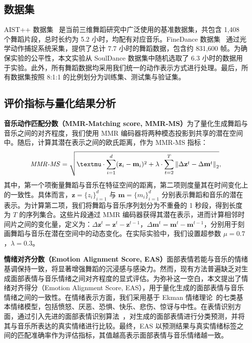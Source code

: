 \subsection{数据集}
AIST++ 数据集~\cite{li2021ai} 是当前三维舞蹈研究中广泛使用的基准数据集，共包含 1,408 个舞蹈片段，总时长约为 5.2 小时，均配有对应音乐。FineDance 数据集~\cite{li2023finedance} 通过光学动作捕捉系统采集，提供了总计 7.7 小时的舞蹈数据，包含约 831,600 帧。为确保实验的公平性，本文实验从 SoulDance 数据集中随机选取了 6.3 小时的数据用于实验。此外，所有舞蹈数据均采用我们统一的动作表示方式进行处理。最后，所有数据集按照 8:1:1 的比例划分为训练集、测试集与验证集。

\subsection{评价指标与量化结果分析}
\noindent\textbf{音乐动作匹配分数（MMR-Matching score, MMR-MS）}\quad  为了量化生成舞蹈与音乐之间的对齐程度，我们使用 MMR 编码器将两种模态投影到共享的潜在空间中。随后，计算其潜在表示之间的欧氏距离，作为 MMR-MS 指标：
\begin{equation}
\begin{aligned}
    \text{\textit{MMR-MS}} = \sqrt{\mu \cdot\sum_{i=1}^{d} (\mathbf{z}_i - \mathbf{m}_i)^2+\lambda \cdot \sum_{t=2}^T \left\Vert \Delta\mathbf{z}^t - \Delta\mathbf{m}^t \right\Vert_2},
\end{aligned}
\label{eq:mmr_ms}
\end{equation}
其中，第一个项衡量舞蹈与音乐在特征空间的距离，第二项则度量其在时间变化上的一致性。具体而言，$\mathbf{z} = \{z_i\}_{i=1}^d$ 与 $\mathbf{m} = \{m_i\}_{i=1}^d$ 分别表示舞蹈和音乐的潜在表示。为计算第二项，我们将舞蹈与音乐序列划分为不重叠的 1 秒段，得到长度为 $T$ 的序列集合。这些片段通过 MMR 编码器获得其潜在表示，进而计算相邻时间片之间的变化量，定义为：$\Delta\mathbf{z}^t = \mathbf{z}^t - \mathbf{z}^{t-1}$，$\Delta\mathbf{m}^t = \mathbf{m}^t - \mathbf{m}^{t-1}$，分别用于刻画舞蹈与音乐在潜在空间中的动态变化。在实际实验中，我们设置超参数 $\mu = 0.7$，$\lambda = 0.3$。



\noindent\textbf{情绪对齐分数（Emotion Alignment Score, EAS）}\quad  面部表情若能与音乐的情绪基调保持一致，将显著增强舞蹈的沉浸感与感染力。然而，现有方法普遍缺乏对生成面部表情与音乐情绪之间对齐程度的显式评估。为弥补这一空白，本文提出了情绪对齐得分（Emotion Alignment Score, EAS），用于量化生成的面部表情与音乐情绪之间的一致性。在情绪表示方面，我们采用基于 Ekman 情绪理论~\cite{ekman1971constants}的七类基本情绪模型，包括愤怒、厌恶、恐惧、快乐、悲伤、惊讶与中性。在表情识别方面，通过引入先进的面部表情识别算法~\cite{savchenko2023facial, xue2022vision}，对生成的面部表情进行分类预测，并将其与音乐所表达的真实情绪进行比较。最终，EAS 以预测结果与真实情绪标签之间的匹配准确率作为评估指标，其值越高表示面部表情与音乐情绪越一致。

